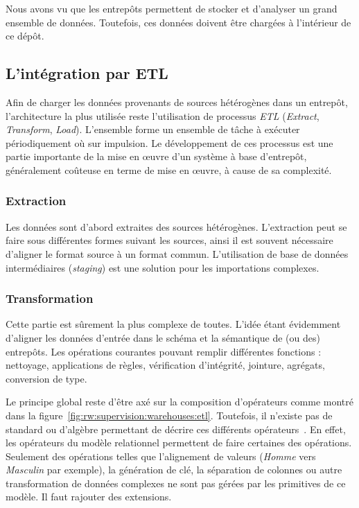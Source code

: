 Nous avons vu que les entrepôts permettent de stocker et d'analyser un grand ensemble de données. Toutefois, ces données doivent être chargées à l'intérieur de ce dépôt.
\subsection{L'intégration par ETL}\label{sec:rw:supervision:warehouse:etl}
Afin de charger les données provenants de sources hétérogènes dans un entrepôt, l'architecture la plus utilisée reste l'utilisation de processus \textit{ETL} (\textit{Extract}, \textit{Transform}, \textit{Load}). L'ensemble forme un ensemble de tâche à exécuter périodiquement où sur impulsion. Le développement de ces processus est une partie importante de la mise en œuvre d'un système à base d'entrepôt, généralement coûteuse en terme de mise en œuvre, à cause de sa complexité.
\subsubsection{Extraction}
Les données sont d'abord extraites des sources hétérogènes. L'extraction peut se faire sous différentes formes suivant les sources, ainsi il est souvent nécessaire d'aligner le format source à un format commun. L'utilisation de base de données intermédiaires (\textit{staging}) est une solution pour les importations complexes.

\subsubsection{Transformation}
Cette partie est sûrement la plus complexe de toutes. L'idée étant évidemment d'aligner les données d'entrée dans le schéma et la sémantique de (ou des) entrepôts. Les opérations courantes pouvant remplir différentes fonctions : nettoyage, applications de règles, vérification d'intégrité, jointure, agrégats, conversion de type. 

Le principe global reste d'être axé sur la composition d'opérateurs comme montré dans la figure~\ref{fig:rw:supervision:warehouses:etl}. Toutefois, il n'existe pas de standard ou d'algèbre permettant de décrire ces différents opérateurs~\cite{Vassiliadis:taxonomy}. En effet, les opérateurs du modèle relationnel permettent de faire certaines des opérations. Seulement des opérations telles que l'alignement de valeurs (\textit{Homme} vers \textit{Masculin} par exemple), la génération de clé, la séparation de colonnes ou autre transformation de données complexes ne sont pas gérées par les primitives de ce modèle. Il faut rajouter des extensions. 

